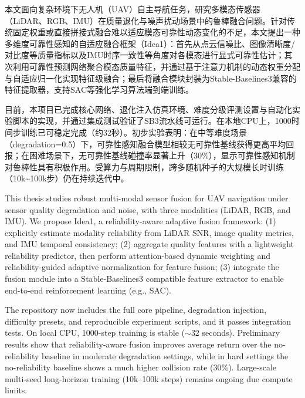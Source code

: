 
\begin{cabstract}
本文面向复杂环境下无人机（UAV）自主导航任务，研究多模态传感器（LiDAR、RGB、IMU）在质量退化与噪声扰动场景中的鲁棒融合问题。针对传统固定权重或直接拼接式融合难以适应模态可靠性动态变化的不足，本文提出一种多维度可靠性感知的自适应融合框架（Idea1）：首先从点云信噪比、图像清晰度/对比度等质量指标以及IMU时序一致性等角度对各模态进行显式可靠性估计；其次利用可靠性预测网络聚合模态质量特征，并通过基于注意力机制的动态权重分配与自适应归一化实现特征级融合；最后将融合模块封装为Stable-Baselines3兼容的特征提取器，支持SAC等强化学习算法端到端训练。

目前，本项目已完成核心网络、退化注入仿真环境、难度分级评测设置与自动化实验脚本的实现，并通过集成测试验证了SB3流水线可运行。在本地CPU上，1000时间步训练已可稳定完成（约32秒）。初步实验表明：在中等难度场景（degradation=0.5）下，可靠性感知融合模型相较无可靠性基线获得更高平均回报；在困难场景下，无可靠性基线碰撞率显著上升（30\%），显示可靠性感知机制对鲁棒性具有积极作用。受算力与周期限制，跨多随机种子的大规模长时训练（10k\textasciitilde100k步）仍在持续迭代中。
\end{cabstract}

\begin{eabstract}
This thesis studies robust multi-modal sensor fusion for UAV navigation under sensor quality degradation and noise, with three modalities (LiDAR, RGB, and IMU). We propose Idea1, a reliability-aware adaptive fusion framework: (1) explicitly estimate modality reliability from LiDAR SNR, image quality metrics, and IMU temporal consistency; (2) aggregate quality features with a lightweight reliability predictor, then perform attention-based dynamic weighting and reliability-guided adaptive normalization for feature fusion; (3) integrate the fusion module into a Stable-Baselines3 compatible feature extractor to enable end-to-end reinforcement learning (e.g., SAC).

The repository now includes the full core pipeline, degradation injection, difficulty presets, and reproducible experiment scripts, and it passes integration tests. On local CPU, 1000-step training is stable (\(\sim 32\) seconds). Preliminary results show that reliability-aware fusion improves average return over the no-reliability baseline in moderate degradation settings, while in hard settings the no-reliability baseline shows a much higher collision rate (30\%). Large-scale multi-seed long-horizon training (10k--100k steps) remains ongoing due compute limits.
\end{eabstract}
